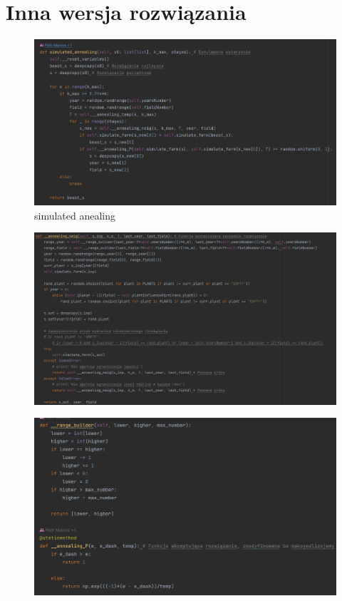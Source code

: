\documentclass[12pt,a4paper]{article}
\begin{document}
\section{Inna wersja rozwiązania}

\begin{figure}[H]
	\centering
	\includegraphics[width=1\linewidth]{screens/mamos_sim_anealing}
	\caption{simulated anealing}
	\label{fig:mamossimanealing}
\end{figure}

\begin{figure}[H]
	\centering
	\includegraphics[width=1\linewidth]{screens/mamos_anealing_neig}
	\caption{}
	\label{fig:mamosanealingneig}
\end{figure}

\begin{figure}[H]
	\centering
	\includegraphics[width=1\linewidth]{screens/mamos_anealing_p_range_builder}
	\caption{}
	\label{fig:mamosanealingprangebuilder}
\end{figure}
\end{document}

